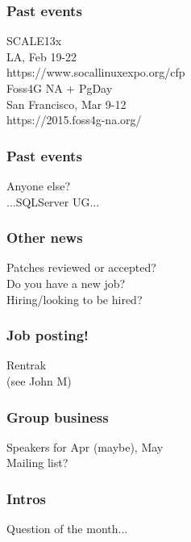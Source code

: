 \documentclass{beamer}
\begin{document}
\frame
{
  \frametitle{Past events}
  \begin{center}
{\large SCALE13x\\}
LA, Feb 19-22\\
https://www.socallinuxexpo.org/cfp\\
\vspace{5 mm}
{\large Foss4G NA + PgDay\\}
San Francisco, Mar 9-12\\
https://2015.foss4g-na.org/\\
  \end{center}
}

\frame
{
  \frametitle{Past events}
  \begin{center}
Anyone else?\\
{\tiny ...SQLServer UG...}
  \end{center}
}

\frame
{
  \frametitle{Other news}
  \begin{center}
Patches reviewed or accepted?\\
Do you have a new job?\\
Hiring/looking to be hired?\\
  \end{center}
}

\frame
{
  \frametitle{Job posting!}
  \begin{center}
Rentrak\\
(see John M)\\

  \end{center}
}

\frame
{
  \frametitle{Group business}
  \begin{center}
Speakers for Apr (maybe), May\\
Mailing list?
  \end{center}
}

\frame
{
  \frametitle{Intros}
  \begin{center}
Question of the month...\\
  \end{center}
}
\end{document}

